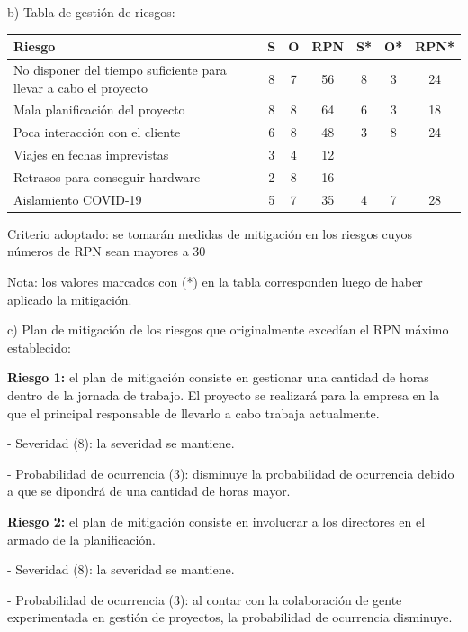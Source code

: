 \documentclass[11pt]{charter}
\begin{document}
b) Tabla de gestión de riesgos:

\begin{table}[htpb]
\centering
\begin{tabularx}{\linewidth}{@{}|X|c|c|c|c|c|c|@{}}
\hline
\rowcolor[HTML]{C0C0C0} 
Riesgo & S & O & RPN & S* & O* & RPN* \\ \hline
   No disponer del tiempo suficiente para llevar a cabo el proyecto    &  8 &  7 &  56   &  8  &  3  &  24    \\ \hline
   Mala planificación del proyecto    &  8 &  8 &  64   &  6  &  3  &  18    \\ \hline
   Poca interacción con el cliente    &  6 &  8 &  48   &  3  &  8  &  24    \\ \hline
   Viajes en fechas imprevistas    &  3 &  4 &  12   &    &    &      \\ \hline
   Retrasos para conseguir hardware    &  2 &  8 &  16   &    &    &      \\ \hline
   Aislamiento COVID-19    &  5 &  7 &  35   &  4  &  7  &  28    \\ \hline
\end{tabularx}%
\end{table}

Criterio adoptado: 
se tomarán medidas de mitigación en los riesgos cuyos números de RPN sean mayores a 30

Nota: los valores marcados con (*) en la tabla corresponden luego de haber aplicado la mitigación.

c) Plan de mitigación de los riesgos que originalmente excedían el RPN máximo establecido:
 
\textbf{Riesgo 1: } el plan de mitigación consiste en gestionar una cantidad de horas dentro de la jornada de trabajo. El proyecto se realizará para la empresa en la que el principal responsable de llevarlo a cabo trabaja actualmente.
  
  - Severidad (8): la severidad se mantiene.
  
  - Probabilidad de ocurrencia (3): disminuye la probabilidad de ocurrencia debido a que se dipondrá de una cantidad de horas mayor.

\textbf{Riesgo 2: } el plan de mitigación consiste en involucrar a los directores en el armado de la planificación.
  
  - Severidad (8): la severidad se mantiene.
  
  - Probabilidad de ocurrencia (3): al contar con la colaboración de gente experimentada en gestión de proyectos, la probabilidad de ocurrencia disminuye.
\end{document}
